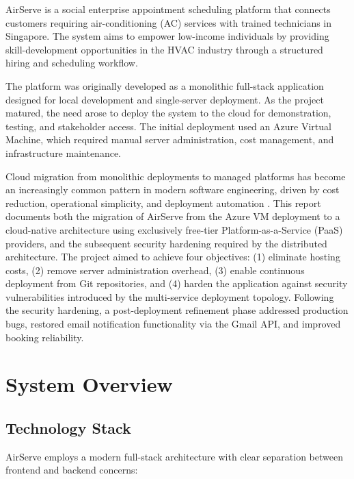 \documentclass[conference]{IEEEtran}
\begin{document}
AirServe is a social enterprise appointment scheduling platform that connects customers requiring air-conditioning (AC) services with trained technicians in Singapore. The system aims to empower low-income individuals by providing skill-development opportunities in the HVAC industry through a structured hiring and scheduling workflow.

The platform was originally developed as a monolithic full-stack application designed for local development and single-server deployment. As the project matured, the need arose to deploy the system to the cloud for demonstration, testing, and stakeholder access. The initial deployment used an Azure Virtual Machine, which required manual server administration, cost management, and infrastructure maintenance.

Cloud migration from monolithic deployments to managed platforms has become an increasingly common pattern in modern software engineering, driven by cost reduction, operational simplicity, and deployment automation \cite{b6}. This report documents both the migration of AirServe from the Azure VM deployment to a cloud-native architecture using exclusively free-tier Platform-as-a-Service (PaaS) providers, and the subsequent security hardening required by the distributed architecture. The project aimed to achieve four objectives: (1) eliminate hosting costs, (2) remove server administration overhead, (3) enable continuous deployment from Git repositories, and (4) harden the application against security vulnerabilities introduced by the multi-service deployment topology. Following the security hardening, a post-deployment refinement phase addressed production bugs, restored email notification functionality via the Gmail API, and improved booking reliability.

\section{System Overview}

\subsection{Technology Stack}

AirServe employs a modern full-stack architecture with clear separation between frontend and backend concerns:
\end{document}
